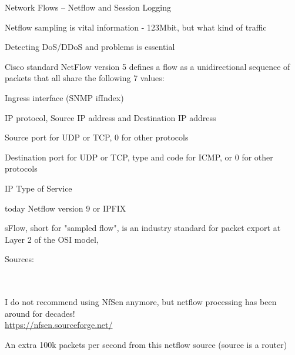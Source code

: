 \documentclass[Screen16to9,17pt]{foils}
\begin{document}
\begin{list1}
\item Network Flows -- Netflow and Session Logging
\item Netflow sampling is vital information - 123Mbit, but what kind of traffic
\item Detecting DoS/DDoS and problems is essential
\item Cisco standard NetFlow version 5 defines a flow as a unidirectional sequence of packets that all share the following 7 values:
\begin{list2}
\item Ingress interface (SNMP ifIndex)
\item IP protocol, Source IP address and Destination IP address
\item Source port for UDP or TCP, 0 for other protocols
\item Destination port for UDP or TCP, type and code for ICMP, or 0 for other protocols
\item IP Type of Service
\end{list2}
\item today Netflow version 9 or IPFIX
\item sFlow, short for "sampled flow", is an industry standard for packet export at Layer 2 of the OSI model,
\end{list1}

Sources: \\{\footnotesize
{}\\
\\
}





I do not recommend using NfSen anymore, but netflow processing has been around for decades!\\
\url{https://nfsen.sourceforge.net/}



\centerline{An extra 100k packets per second from this netflow source (source is a router)}



\end{document}
